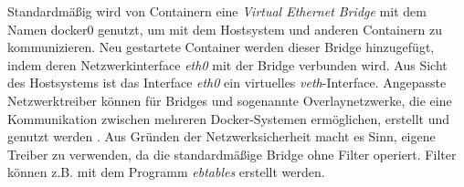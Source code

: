 \documentclass[../main.tex]{subfiles}
\begin{document}
			Standardmäßig wird von Containern eine \emph{Virtual Ethernet Bridge} mit dem Namen docker0 genutzt, um mit dem Hostsystem und anderen Containern zu kommunizieren. Neu gestartete Container werden dieser Bridge hinzugefügt, indem deren Netzwerkinterface \emph{eth0} mit der Bridge verbunden wird. Aus Sicht des Hostsystems ist das Interface \emph{eth0} ein virtuelles \emph{veth}-Interface. Angepasste Netzwerktreiber können für Bridges und sogenannte Overlaynetzwerke, die eine Kommunikation zwischen mehreren Docker-Systemen ermöglichen, erstellt und genutzt werden \cite[S.3]{virtVSContainer}\cite{dockerNetworking}. Aus Gründen der Netzwerksicherheit macht es Sinn, eigene Treiber zu verwenden, da die standardmäßige Bridge ohne Filter operiert. Filter können z.B. mit dem Programm \emph{ebtables} erstellt werden.




\end{document}
